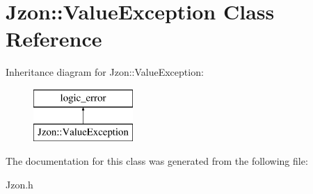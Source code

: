 \hypertarget{class_jzon_1_1_value_exception}{\section{Jzon\-:\-:Value\-Exception Class Reference}
\label{class_jzon_1_1_value_exception}
}
Inheritance diagram for Jzon\-:\-:Value\-Exception\-:\begin{figure}[H]
\begin{center}
\leavevmode
\includegraphics[height=2.000000cm]{class_jzon_1_1_value_exception}
\end{center}
\end{figure}


The documentation for this class was generated from the following file\-:\begin{DoxyCompactItemize}
\item 
Jzon.\-h\end{DoxyCompactItemize}
